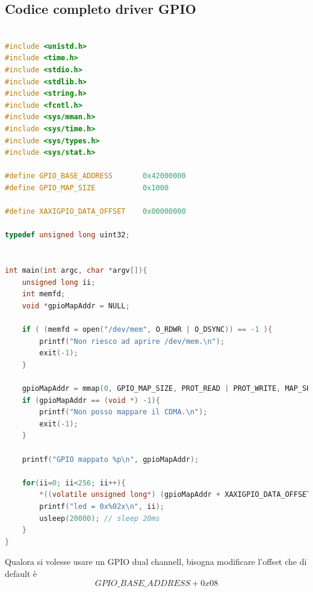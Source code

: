 \section{Codice completo driver GPIO}
\label{GPIO}
\begin{lstlisting}[language=c, label=lst:sh, caption={Codice completo del driver GPIO}]

#include <unistd.h>
#include <time.h>
#include <stdio.h>
#include <stdlib.h>
#include <string.h>
#include <fcntl.h>
#include <sys/mman.h>
#include <sys/time.h>
#include <sys/types.h>
#include <sys/stat.h>

#define GPIO_BASE_ADDRESS       0x42000000
#define GPIO_MAP_SIZE           0x1000

#define XAXIGPIO_DATA_OFFSET    0x00000000

typedef unsigned long uint32;


int main(int argc, char *argv[]){
    unsigned long ii;
    int memfd;
    void *gpioMapAddr = NULL;

    if ( (memfd = open("/dev/mem", O_RDWR | O_DSYNC)) == -1 ){
        printf("Non riesco ad aprire /dev/mem.\n");
        exit(-1);
    }

    gpioMapAddr = mmap(0, GPIO_MAP_SIZE, PROT_READ | PROT_WRITE, MAP_SHARED, memfd, GPIO_BASE_ADDRESS);
    if (gpioMapAddr == (void *) -1){
        printf("Non posso mappare il CDMA.\n");
        exit(-1);
    }
    
    printf("GPIO mappato %p\n", gpioMapAddr);

    for(ii=0; ii<256; ii++){
        *((volatile unsigned long*) (gpioMapAddr + XAXIGPIO_DATA_OFFSET)) = ii;
        printf("led = 0x%02x\n", ii);
        usleep(20000); // sleep 20ms
    }
}

\end{lstlisting}
Qualora si volesse usare un GPIO dual channell, bisogna modificare l'offset che di default è 
$$GPIO\_BASE\_ADDRESS+ 0x08$$



\chapter{}
